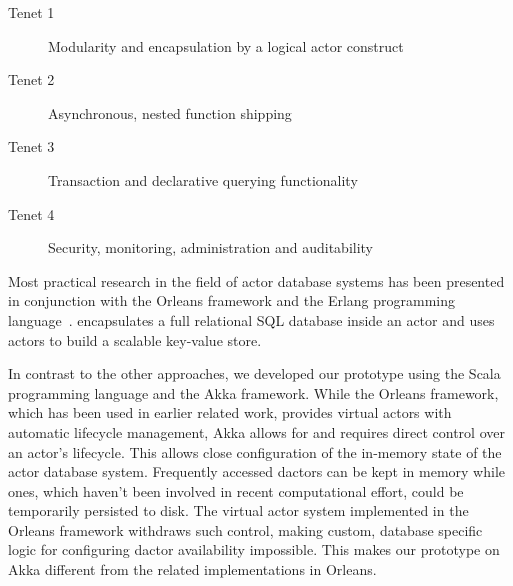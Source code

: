   \begin{description}
    \item[Tenet 1] Modularity and encapsulation by a logical actor construct
    \item[Tenet 2] Asynchronous, nested function shipping
    \item[Tenet 3] Transaction and declarative querying functionality
    \item[Tenet 4] Security, monitoring, administration and auditability
  \end{description}

  Most practical research in the field of actor database systems has been presented in conjunction with the Orleans framework and the Erlang programming language~\cite{Shah:reactdb,Eldeeb:transactions,Bernstein:indexing}.
   encapsulates a full relational SQL database inside an actor and \citet{actorbase} uses actors to build a scalable key-value store.

  In contrast to the other approaches, we developed our prototype using the Scala programming language and the Akka framework.
  While the Orleans framework, which has been used in earlier related work, provides virtual actors with automatic lifecycle management, Akka allows for and requires direct control over an actor's lifecycle.
  This allows close configuration of the in-memory state of the actor database system.
  Frequently accessed \glspl{dactor} can be kept in memory while ones, which haven't been involved in recent computational effort, could be temporarily persisted to disk.
  The virtual actor system implemented in the Orleans framework withdraws such control, making custom, database specific logic for configuring \gls{dactor} availability impossible.
  This makes our prototype on Akka different from the related implementations in Orleans.

